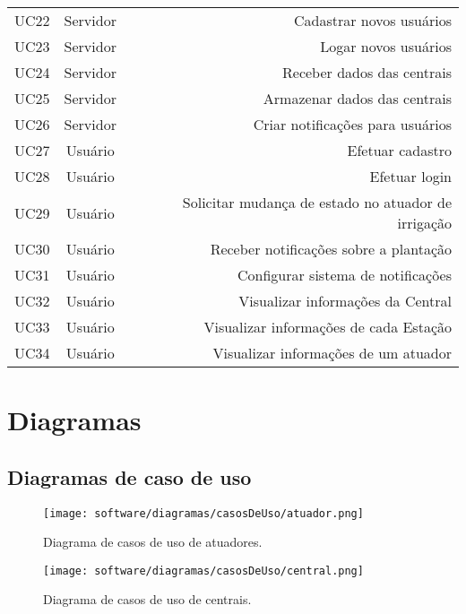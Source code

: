 \begin{table}[H]
\begin{center}
\begin{tabular}{l|c|r}
            UC22 & Servidor & Cadastrar novos usuários\\
            UC23 & Servidor & Logar novos usuários\\
            UC24 & Servidor & Receber dados das centrais\\
            UC25 & Servidor & Armazenar dados das centrais\\
            UC26 & Servidor & Criar notificações para usuários\\
            UC27 & Usuário & Efetuar cadastro\\
            UC28 & Usuário & Efetuar login\\
            UC29 & Usuário & Solicitar mudança de estado no atuador de irrigação\\
            UC30 & Usuário & Receber notificações sobre a plantação\\
            UC31 & Usuário & Configurar sistema de notificações\\
            UC32 & Usuário & Visualizar informações da Central\\
            UC33 & Usuário & Visualizar informações de cada Estação\\
            UC34 & Usuário & Visualizar informações de um atuador\\
          \end{tabular}
        \end{center}
      \end{table}

    \section{Diagramas}

    \subsection{Diagramas de caso de uso}

    \begin{figure}[H]
        \texttt{[image: software/diagramas/casosDeUso/atuador.png]}
        \caption{Diagrama de casos de uso de atuadores.}
        \label{fig:atuador}
    \end{figure}
    
    \begin{figure}[H]
        \texttt{[image: software/diagramas/casosDeUso/central.png]}
        \caption{Diagrama de casos de uso de centrais.}
        \label{fig:central}
    \end{figure}


